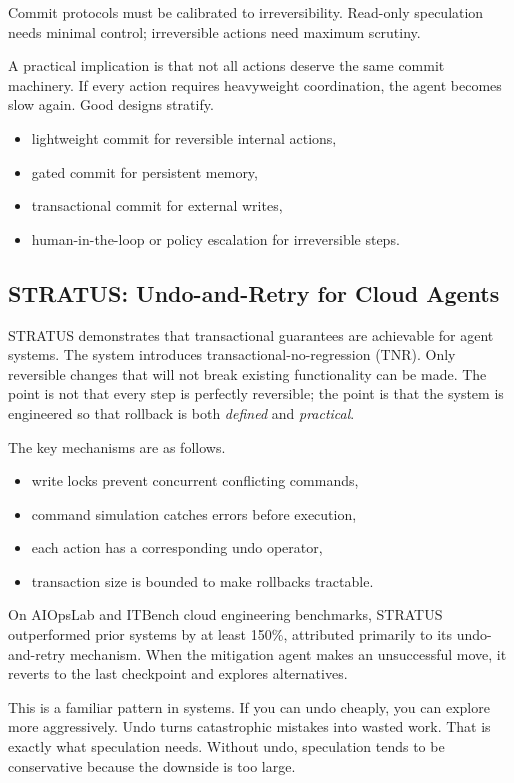 Commit protocols must be calibrated to irreversibility. Read-only speculation needs minimal control; irreversible actions need maximum scrutiny.

A practical implication is that not all actions deserve the same commit machinery. If every action requires heavyweight coordination, the agent becomes slow again. Good designs stratify.
\begin{itemize}
\item lightweight commit for reversible internal actions,
\item gated commit for persistent memory,
\item transactional commit for external writes,
\item human-in-the-loop or policy escalation for irreversible steps.
\end{itemize}

\subsection{STRATUS: Undo-and-Retry for Cloud Agents}

STRATUS \cite{jha2025stratus} demonstrates that transactional guarantees are achievable for agent systems. The system introduces transactional-no-regression (TNR). Only reversible changes that will not break existing functionality can be made. The point is not that every step is perfectly reversible; the point is that the system is engineered so that rollback is both \emph{defined} and \emph{practical}.

The key mechanisms are as follows.

\begin{itemize}
\item write locks prevent concurrent conflicting commands,
\item command simulation catches errors before execution,
\item each action has a corresponding undo operator,
\item transaction size is bounded to make rollbacks tractable.
\end{itemize}

On AIOpsLab and ITBench cloud engineering benchmarks, STRATUS outperformed prior systems by at least 150\%, attributed primarily to its undo-and-retry mechanism. When the mitigation agent makes an unsuccessful move, it reverts to the last checkpoint and explores alternatives.

This is a familiar pattern in systems. If you can undo cheaply, you can explore more aggressively. Undo turns catastrophic mistakes into wasted work. That is exactly what speculation needs. Without undo, speculation tends to be conservative because the downside is too large.

